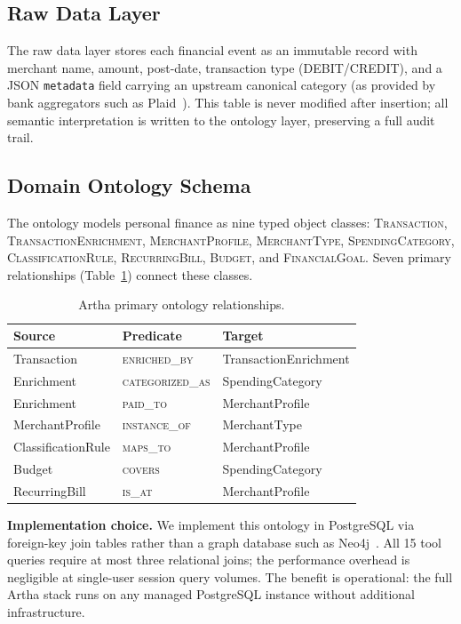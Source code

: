 \documentclass[conference]{IEEEtran}
\begin{document}
\subsection{Raw Data Layer}

The raw data layer stores each financial event as an immutable
record with merchant name, amount, post-date, transaction type
(DEBIT/CREDIT), and a JSON \texttt{metadata} field carrying an
upstream canonical category (as provided by bank aggregators such
as Plaid~\cite{plaid}). This table is never modified after
insertion; all semantic interpretation is written to the ontology
layer, preserving a full audit trail.

\subsection{Domain Ontology Schema}
\label{sec:ontology}

The ontology models personal finance as nine typed object classes:
\textsc{Transaction}, \textsc{TransactionEnrichment},
\textsc{MerchantProfile}, \textsc{MerchantType},
\textsc{SpendingCategory}, \textsc{ClassificationRule},
\textsc{RecurringBill}, \textsc{Budget}, and \textsc{FinancialGoal}.
Seven primary relationships (Table~\ref{tab:rel}) connect these
classes.

\begin{table}[t]
\centering
\caption{Artha primary ontology relationships.}
\label{tab:rel}
\begin{tabular}{@{}lll@{}}
\toprule
Source & Predicate & Target \\
\midrule
Transaction & \textsc{enriched\_by} & TransactionEnrichment \\
Enrichment & \textsc{categorized\_as} & SpendingCategory \\
Enrichment & \textsc{paid\_to} & MerchantProfile \\
MerchantProfile & \textsc{instance\_of} & MerchantType \\
ClassificationRule & \textsc{maps\_to} & MerchantProfile \\
Budget & \textsc{covers} & SpendingCategory \\
RecurringBill & \textsc{is\_at} & MerchantProfile \\
\bottomrule
\end{tabular}
\end{table}

\textbf{Implementation choice.} We implement this ontology in
PostgreSQL via foreign-key join tables rather than a graph database
such as Neo4j~\cite{neo4j}. All 15 tool queries require at most
three relational joins; the performance overhead is negligible at
single-user session query volumes. The benefit is operational: the
full Artha stack runs on any managed PostgreSQL instance without
additional infrastructure.
\end{document}
